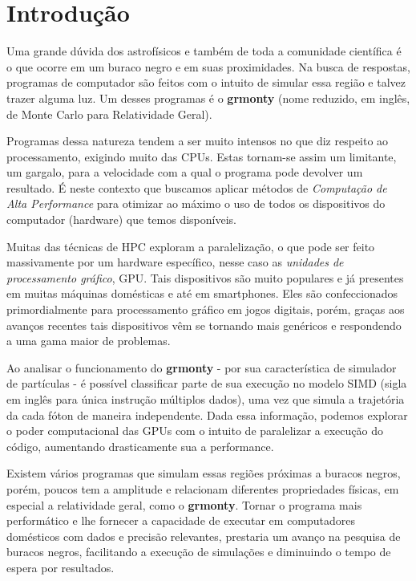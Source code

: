 \chapter{Introdução}
\label{cap:introducao}

Uma grande dúvida dos astrofísicos e também de toda a comunidade científica é o que ocorre em um buraco negro e em suas proximidades. Na busca de respostas, programas de computador são feitos com o intuito de simular essa região e talvez trazer alguma luz. Um desses programas é o \textbf{grmonty}\citep{Dolence:09} (nome reduzido, em inglês, de Monte Carlo para Relatividade Geral).

Programas dessa natureza tendem a ser muito intensos no que diz respeito ao processamento, exigindo muito das CPUs. Estas tornam-se assim um limitante, um gargalo, para a velocidade com a qual o programa pode devolver um resultado. É neste contexto que buscamos aplicar métodos de \emph{Computação de Alta Performance} para otimizar ao máximo o uso de todos os dispositivos do computador (hardware) que temos disponíveis.

Muitas das técnicas de HPC exploram a paralelização, o que pode ser feito massivamente por um hardware específico, nesse caso as \emph{unidades de processamento gráfico}, GPU. Tais dispositivos são muito populares e já presentes em muitas máquinas domésticas e até em smartphones. Eles são confeccionados primordialmente para processamento gráfico em jogos digitais, porém, graças aos avanços recentes tais dispositivos vêm se tornando mais genéricos e respondendo a uma gama maior de problemas.

Ao analisar o funcionamento do \textbf{grmonty} - por sua característica de simulador de partículas - é possível classificar parte de sua execução no modelo SIMD (sigla em inglês para única instrução múltiplos dados), uma vez que simula a trajetória da cada fóton de maneira independente. Dada essa informação, podemos explorar o poder computacional das GPUs com o intuito de paralelizar a execução do código, aumentando drasticamente sua a performance.

Existem vários programas que simulam essas regiões próximas a buracos negros, porém, poucos tem a amplitude e relacionam diferentes propriedades físicas, em especial a relatividade geral, como o \textbf{grmonty}. Tornar o programa mais performático e lhe fornecer a capacidade de executar em computadores domésticos com dados e precisão relevantes, prestaria um avanço na pesquisa de buracos negros, facilitando a execução de simulações e diminuindo o tempo de espera por resultados.

